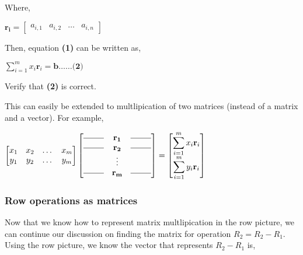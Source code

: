 \documentclass[a4paper]{article}
\begin{document}
            Where,
            \begin{center}
                $
                    \mathbf{r_i} = 
                    \begin{bmatrix}
                    a_{i,1}   &
                    a_{i,2}   &
                    \dots     &
                    a_{i,n} 
                    \end{bmatrix}
                $
            \end{center}
            
            Then, equation \textbf{(1)} can be written as,
            \begin{center}
                $
                \displaystyle\sum_{i=1}^{m}x_i\textbf{r}_i = \textbf{b} \dots\dots \textbf{(2)}
                $
            \end{center}
        
            Verify that \textbf{(2)} is correct.
            
            This can easily be extended to multlipication of two matrices (instead of a matrix and a vector). For example,
            
            \begin{center}
                $
                    \begin{bmatrix}
                x_1   & x_2   & \dots & x_m \\
                y_1   & y_2   & \dots & y_m
                \end{bmatrix}
                \begin{bmatrix}
                \rule[.5ex]{2.5em}{0.4pt} & \mathbf{r_1} & \rule[.5ex]{2.5em}{0.4pt} \\ 
                \rule[.5ex]{2.5em}{0.4pt} & \mathbf{r_2} & \rule[.5ex]{2.5em}{0.4pt} \\
                   & \vdots  &  \\
                \rule[.5ex]{2.5em}{0.4pt} & \mathbf{r_m} & \rule[.5ex]{2.5em}{0.4pt}
                \end{bmatrix}
                 = 
                \begin{bmatrix}
                \displaystyle\sum_{i=1}^{m}x_i\textbf{r}_i \\
                \displaystyle\sum_{i=1}^{m}y_i\textbf{r}_i
                \end{bmatrix}
                $
            \end{center}
            
        \subsubsection{Row operations as matrices}
            Now that we know how to represent matrix multlipication in the row picture, we can continue our discussion on finding the matrix for operation $R_2 = R_2 - R_1$. Using the row picture, we know the vector that represents $R_2 - R_1$ is,
            
\end{document}
